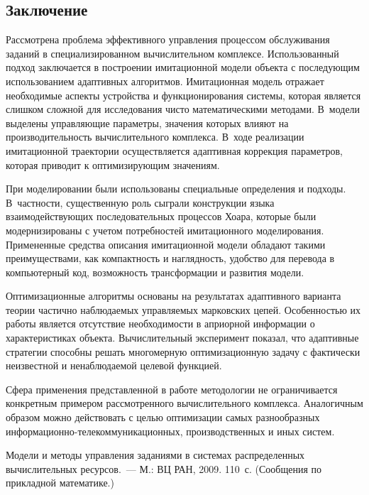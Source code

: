 \begin{multicols}{2}
\section{Заключение}

    Рассмотрена проблема эффективного управ\-ления процессом 
обслуживания заданий в специализированном вычислительном комплексе. 
Использованный подход заключается в построении\linebreak
имитационной модели 
объекта с последующим использованием адаптивных алгоритмов. 
Имитационная модель отражает необходимые аспекты устройства и 
функционирования системы, которая является слишком сложной для 
исследования чисто математическими методами. В~модели выделены 
управ\-ля\-ющие параметры, значения которых влияют на производительность 
вычислительного комплекса. В~ходе реализации имитационной траектории 
осуществляется адаптивная коррекция параметров, которая приводит к 
оптимизирующим значениям.
    
    При моделировании были использованы специальные определения и 
подходы. В~част\-ности, существенную роль сыграли конструкции языка 
взаимодействующих последовательных процессов\linebreak
Хоара, которые были 
модернизированы с учетом потребностей имитационного моделирования. 
Примененные средства описания имитационной модели обладают такими 
преимуществами, как компактность и наглядность, удобство для перевода в 
компьютерный код, возможность трансформации и развития модели.
    
    Оптимизационные алгоритмы основаны на результатах адаптивного 
варианта теории частично наблюдаемых управляемых марковских цепей. 
Особенностью их работы является отсутствие необходимости в априорной 
информации о характеристиках объекта. Вычислительный эксперимент 
показал, что адаптивные стратегии способны решать многомерную 
оптимизационную задачу с фактически неизвестной и ненаблюдаемой 
целевой функцией.
    
    Сфера применения представленной в работе методологии не 
ограничивается конкретным примером рассмотренного вычислительного 
комплекса. Аналогичным образом можно действовать с целью оптимизации 
самых разнообразных 
    ин\-фор\-ма\-ци\-он\-но-те\-ле\-ком\-му\-ни\-ка\-ци\-он\-ных, 
производственных и иных систем.

{\small\frenchspacing
{%
\begin{thebibliography}{9}

    Модели и методы управления заданиями в системах распределенных 
вычислительных ресурсов.~--- М.: ВЦ РАН, 2009. 110~с. (Сообщения по 
прикладной математике.)


\end{thebibliography}}}
\end{multicols}
